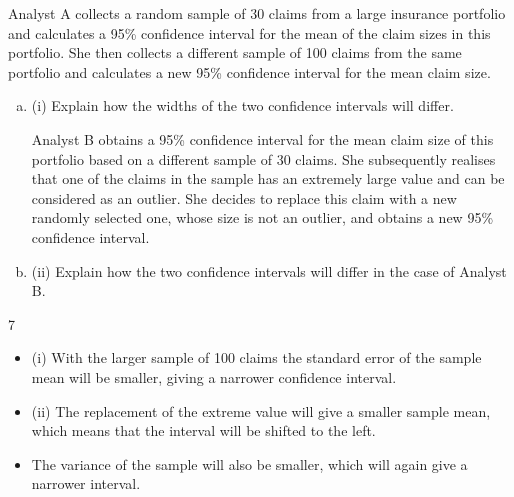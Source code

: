 \documentclass[a4paper,12pt]{article}
\begin{document}


Analyst A collects a random sample of 30 claims from a large insurance portfolio and calculates a 95\% confidence interval for the mean of the claim sizes in this portfolio.
She then collects a different sample of 100 claims from the same portfolio and calculates a new 95\% confidence interval for the mean claim size.
\begin{enumerate}[(a)]
\item (i)
Explain how the widths of the two confidence intervals will differ.

\medskip 

Analyst B obtains a 95\% confidence interval for the mean claim size of this portfolio based on a different sample of 30 claims. She subsequently realises that one of the
claims in the sample has an extremely large value and can be considered as an outlier.
She decides to replace this claim with a new randomly selected one, whose size is not an outlier, and obtains a new 95\% confidence interval.
\item (ii)
Explain how the two confidence intervals will differ in the case of Analyst B.
\end{enumerate}

\newpage


7
\begin{itemize}
\item (i) With the larger sample of 100 claims the standard error of the sample mean will be smaller, giving a narrower confidence interval.
\item (ii) The replacement of the extreme value will give a smaller sample mean, which means that the interval will be shifted to the left.
\item The variance of the sample will also be smaller, which will again give a narrower interval.
\end{itemize}
\end{document}
